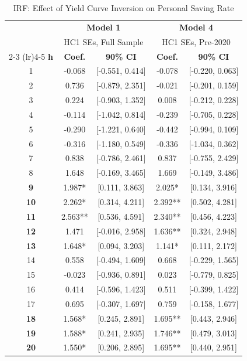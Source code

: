\begin{table}[htbp]
\centering\small
\caption{IRF: Effect of Yield Curve Inversion on Personal Saving Rate}
\label{tab:irf_exp1}
\begin{tabular}{c cccc}
\toprule
 & \multicolumn{2}{c}{\textbf{Model 1}} & \multicolumn{2}{c}{\textbf{Model 4}} \\
 & \multicolumn{2}{c}{HC1 SEs, Full Sample} & \multicolumn{2}{c}{HC1 SEs, Pre-2020} \\
\cmidrule(lr){2-3} \cmidrule(lr){4-5}
\textbf{h} & \textbf{Coef.} & \textbf{90\% CI} & \textbf{Coef.} & \textbf{90\% CI} \\
\midrule
1 & -0.068 & [-0.551, 0.414] & -0.078 & [-0.220, 0.063] \\
2 & 0.736 & [-0.879, 2.351] & -0.021 & [-0.201, 0.159] \\
3 & 0.224 & [-0.903, 1.352] & 0.008 & [-0.212, 0.228] \\
4 & -0.114 & [-1.042, 0.814] & -0.239 & [-0.705, 0.228] \\
5 & -0.290 & [-1.221, 0.640] & -0.442 & [-0.994, 0.109] \\
6 & -0.316 & [-1.180, 0.549] & -0.336 & [-1.034, 0.362] \\
7 & 0.838 & [-0.786, 2.461] & 0.837 & [-0.755, 2.429] \\
8 & 1.648 & [-0.169, 3.465] & 1.669 & [-0.149, 3.486] \\
\textbf{9} & 1.987* & [0.111, 3.863] & 2.025* & [0.134, 3.916] \\
\textbf{10} & 2.262* & [0.314, 4.211] & 2.392** & [0.502, 4.281] \\
\textbf{11} & 2.563** & [0.536, 4.591] & 2.340** & [0.456, 4.223] \\
\textbf{12} & 1.471 & [-0.016, 2.958] & 1.636** & [0.324, 2.948] \\
\textbf{13} & 1.648* & [0.094, 3.203] & 1.141* & [0.111, 2.172] \\
14 & 0.558 & [-0.494, 1.609] & 0.668 & [-0.229, 1.565] \\
15 & -0.023 & [-0.936, 0.891] & 0.023 & [-0.779, 0.825] \\
16 & 0.414 & [-0.596, 1.423] & 0.511 & [-0.399, 1.422] \\
17 & 0.695 & [-0.307, 1.697] & 0.759 & [-0.158, 1.677] \\
\textbf{18} & 1.568* & [0.245, 2.891] & 1.695** & [0.443, 2.946] \\
\textbf{19} & 1.588* & [0.241, 2.935] & 1.746** & [0.479, 3.013] \\
\textbf{20} & 1.550* & [0.206, 2.895] & 1.695** & [0.440, 2.951] \\

\end{tabular}
\end{table}
